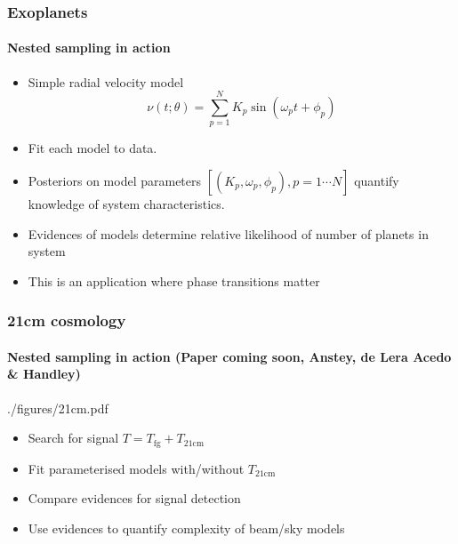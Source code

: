 \documentclass[%
]{beamer}
\begin{document}
\begin{frame}
  \frametitle{Exoplanets}
  \framesubtitle{Nested sampling in action}
  \begin{itemize}
      \item Simple radial velocity model
          \begin{equation}
              \nu(t;\theta) = \sum_{p=1}^N K_p \sin(\omega_p t + \phi_p)\nonumber
          \end{equation}
      \item Fit each model to data.
      \item Posteriors on model parameters $[(K_p,\omega_p,\phi_p),p=1\cdots N]$ quantify knowledge of system characteristics.
      \item Evidences of models determine relative likelihood of number of planets in system
      \item This is an application where phase transitions matter
  \end{itemize}
\end{frame}

\begin{frame}
  \frametitle{21cm cosmology}
  \framesubtitle{Nested sampling in action (Paper coming soon, Anstey, de Lera Acedo \& Handley)}
    \begin{figright}[0.3]{./figures/21cm.pdf}
        \begin{itemize}
            \item Search for signal  $T=T_\mathrm{fg} + T_\mathrm{21cm}$ 
            \item Fit parameterised models with/without $T_\mathrm{21cm}$
            \item Compare evidences for signal detection
            \item Use evidences to quantify complexity of beam/sky models
        \end{itemize}
    \end{figright}
\end{frame}
\end{document}
